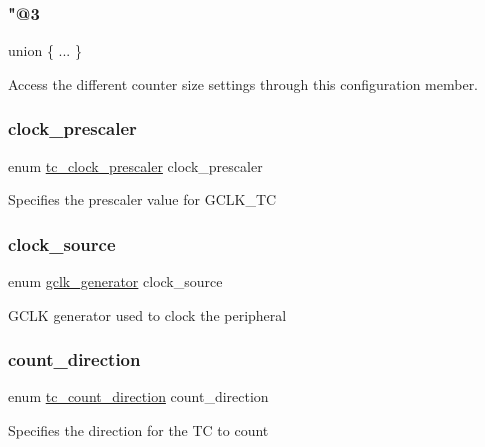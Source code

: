 \subsubsection{\texorpdfstring{"@3}{@3}}
{\footnotesize\ttfamily union \{ ... \} }

Access the different counter size settings through this configuration member. \mbox{\label{structtc__config_a4951355c92f0839f9e046d508bf33d6d}} 
\subsubsection{\texorpdfstring{clock\_prescaler}{clock\_prescaler}}
{\footnotesize\ttfamily enum \mbox{\hyperlink{group__asfdoc__sam0__tc__group_ga98aed17b995157e67b9322a45f0ed5f4}{tc\+\_\+clock\+\_\+prescaler}} clock\+\_\+prescaler}

Specifies the prescaler value for G\+C\+L\+K\+\_\+\+TC \mbox{\label{structtc__config_a07b9a1a157ab9a693f45af19a8206fc0}} 
\subsubsection{\texorpdfstring{clock\_source}{clock\_source}}
{\footnotesize\ttfamily enum \mbox{\hyperlink{group__asfdoc__sam0__system__clock__group_ga1ab9bb87560ad127ed982591b7d67311}{gclk\+\_\+generator}} clock\+\_\+source}

G\+C\+LK generator used to clock the peripheral \mbox{\label{structtc__config_a1caed956de0dc0e40514dc3ea29692bb}} 
\subsubsection{\texorpdfstring{count\_direction}{count\_direction}}
{\footnotesize\ttfamily enum \mbox{\hyperlink{group__asfdoc__sam0__tc__group_ga28777c47943dfb2b5de0fd7ae14eac1f}{tc\+\_\+count\+\_\+direction}} count\+\_\+direction}

Specifies the direction for the TC to count \mbox{\label{structtc__config_a0e6abf2c2116b8e204f8f6cdf6bef8c9}} 
